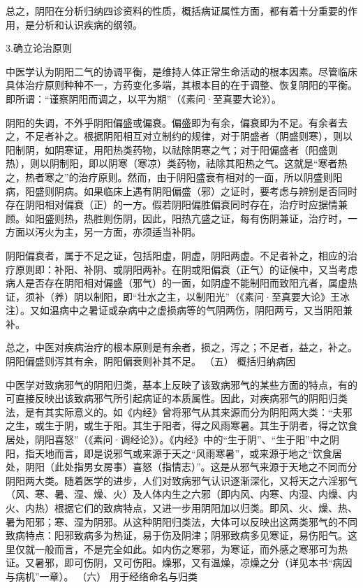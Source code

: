 \documentclass[a4paper,12pt,UTF8,twoside]{ctexbook}
\begin{document}
总之，阴阳在分析归纳四诊资料的性质，概括病证属性方面，都有着十分重要的作用，是分析和认识疾病的纲领。

3.确立论治原则

中医学认为阴阳二气的协调平衡，是维持人体正常生命活动的根本因素。尽管临床具体治疗原则种种不一，方药变化多端，其根本目的在于调整、恢复阴阳的平衡。即所谓：“谨察阴阳而调之，以平为期”（《素问·至真要大论》）。

阴阳的失调，不外乎阴阳偏盛或偏衰。偏盛即为有余，偏衰即为不足。有余者去之，不足者补之。根据阴阳相互对立制约的规律，对于阴盛者（阴盛则寒），则以阳制阴，如阴寒证，用阳热类药物，以祛除阴寒之气；对于阳偏盛者（阳盛则热），则以阴制阳，即以阴寒（寒凉）类药物，祛除其阳热之气。这就是“寒者热之，热者寒之”的治疗原则。然而，由于阴阳盛衰有相对的一面，所以阴盛则阳病，阳盛则阴病。如果临床上遇有阴阳偏盛（邪）之证时，要考虑与辨别是否同时存在阴阳相对偏衰（正）的一方。假若阴阳偏胜偏衰同时存在，治疗时应据情兼顾。如阳盛则热，热胜则伤阴，因此，阳热亢盛之证，每有伤阴兼证，治疗时，一方面以泻火为主，另一方面，亦须适当补阴。

阴阳偏衰者，属于不足之证，包括阳虚，阴虚，阴阳两虚。不足者补之，相应的治疗原则即：补阳、补阴、或阴阳两补。在阴或阳偏衰（正气）的证候中，又当考虑病人是否存在阴阳相对偏盛（邪气）的一面，如阴虚不能制阳而致阳亢者，属虚热证，须补（养）阴以制阳，即“壮水之主，以制阳光”（《素问·至真要大论》王冰注）。又如温病中之暑证或杂病中之虚损病等的气阴两伤，阴阳两亏，又当阴阳兼补。

总之，中医对疾病治疗的根本原则是有余者，损之，泻之；不足者，益之，补之。阴阳偏盛则泻其有余，阴阳偏衰则补其不足。
（五） 概括归纳病因

中医学对致病邪气的阴阳归类，基本上反映了该致病邪气的某些方面的特点，有的可直接反映出该致病邪气所引起病证的本质属性。因此，对疾病邪气的阴阳归类法，是有其实际意义的。如《内经》曾将邪气从其来源而分为阴阳两大类：“夫邪之生，或生于阴，或生于阳。其生于阳者，得之风雨寒暑。其生于阴者，得之饮食居处，阴阳喜怒”（《素问·调经论》）。《内经》中的“生于阴”、“生于阳”中之阴阳，指天地而言，即是说邪气或来源于天之“风雨寒暑”，或来源于地之“饮食居处，阴阳（此处指男女房事）喜怒（指情志）”。这是从邪气来源于天地之不同而分阴阳两大类。随着医学的进步，人们对致病邪气认识逐渐深化，又将天之六淫邪气（风、寒、暑、湿、燥、火）及人体内生之六邪（即内风、内寒、内湿、内燥、内火、内热）根据它们的致病特点，又进一步用阴阳加以归类。即风、火、燥、热、暑为阳邪；寒、湿为阴邪。从这种阴阳归类法，大体可以反映出这两类邪气的不同致病特点：阳邪致病多为热证，易于伤及阴津；阴邪致病多见寒证，易伤阳气。这里仅就一般而言，不是完全如此。如内伤之寒邪，为寒证，而外感之寒邪可为热证。又暑邪，即可伤阴，又可伤阳。燥邪，又有温燥，凉燥之分（详见本书“病因与病机”一章）。
（六） 用于经络命名与归类
\end{document}
